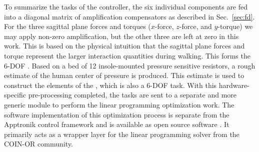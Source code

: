 To summarize the tasks of the controller, the six individual  components  are fed into a diagonal matrix of amplification compensators as described in Sec.~\ref{sec:fd}.  For the three sagittal plane forces and torques ($x$-force, $z$-force, and $y$-torque) we may apply non-zero amplification, but the other three are left at zero in this work. This is based on the physical intuition that the sagittal plane forces and torque represent the larger interaction quantities during walking. This forms the 6-DOF .
Based on a bed of 12 insole-mounted pressure sensitive resistors, a rough estimate of the human center of pressure is produced. This estimate is used to construct the elements of the , which is also a 6-DOF task.
With this hardware-specific pre-processing completed, the tasks are sent to a separate and more generic module to perform the linear programming optimization work. The software implementation of this optimization process is separate from the Apptronik control framework and is available as open source software \cite{Thomas2019LPExo}. It primarily acts as a wrapper layer for the linear programming solver from the COIN-OR \cite{LougeeHeimer2003IBM} community.

